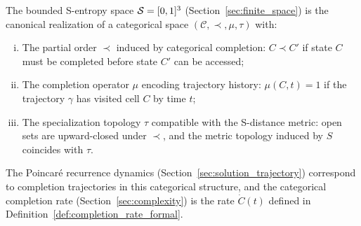 \begin{theorem}
\label{thm:s_space_poincare}
The bounded S-entropy space $\mathcal{S} = [0,1]^3$ (Section~\ref{sec:finite_space}) is the canonical realization of a categorical space $(\mathcal{C}, \prec, \mu, \tau)$ with:
\begin{enumerate}[(i)]
    \item The partial order $\prec$ induced by categorical completion: $C \prec C'$ if state $C$ must be completed before state $C'$ can be accessed;
    
    \item The completion operator $\mu$ encoding trajectory history: $\mu(C, t) = 1$ if the trajectory $\gamma$ has visited cell $C$ by time $t$;
    
    \item The specialization topology $\tau$ compatible with the S-distance metric: open sets are upward-closed under $\prec$, and the metric topology induced by $S$ coincides with $\tau$.
\end{enumerate}

The Poincaré recurrence dynamics (Section~\ref{sec:solution_trajectory}) correspond to completion trajectories in this categorical structure, and the categorical completion rate (Section~\ref{sec:complexity}) is the rate $\dot{C}(t)$ defined in Definition~\ref{def:completion_rate_formal}.
\end{theorem}

